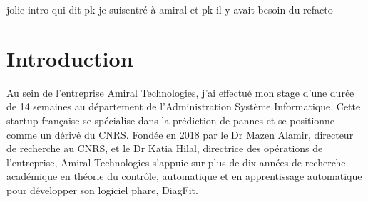 jolie intro qui dit pk je suisentré à amiral et pk il y avait besoin du refacto



\section{Introduction}
Au sein de l'entreprise Amiral Technologies, j'ai effectué mon stage d'une durée de 14 semaines au département de l'Administration Système Informatique.
 Cette startup française se spécialise dans la prédiction de pannes et se positionne comme un dérivé du CNRS.
 Fondée en 2018 par le Dr Mazen Alamir, directeur de recherche au CNRS, et le Dr Katia Hilal, directrice des opérations de l'entreprise, Amiral Technologies s'appuie sur plus de dix années de recherche académique en théorie du contrôle, automatique et en apprentissage automatique pour développer son logiciel phare, DiagFit.
